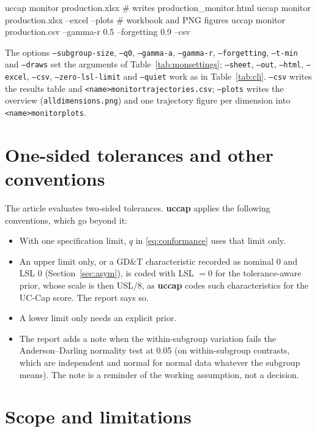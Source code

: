 \documentclass[a4paper,11pt,oneside,openany,parskip=half-,headings=standardclasses,toc=flat,numbers=noenddot]{scrbook}
\newcommand{\code}[1]{\texttt{\begingroup\def\_{\textunderscore\allowbreak}#1\endgroup}}
\newcommand{\pkg}{\textsf{\bfseries uccap}}
\newcommand{\secref}[1]{Section~\ref{#1}}
\newcommand{\tabref}[1]{Table~\ref{#1}}
\begin{document}
\begin{shcode}
uccap monitor production.xlsx                  # writes production_monitor.html
uccap monitor production.xlsx --excel --plots  # workbook and PNG figures
uccap monitor production.csv --gamma-r 0.5 --forgetting 0.9 --csv
\end{shcode}

The options \code{--subgroup-size}, \code{--q0}, \code{--gamma-a}, \code{--gamma-r}, \code{--forgetting},
\code{--t-min} and \code{--draws} set the arguments of \tabref{tab:monsettings}; \code{--sheet}, \code{--out},
\code{--html}, \code{--excel}, \code{--csv}, \code{--zero-lsl-limit} and \code{--quiet} work as in \tabref{tab:cli}.
\code{--csv} writes the results table and \code{<name>\_monitor\_trajectories.csv}; \code{--plots} writes the overview
(\code{all\_dimensions.png}) and one trajectory figure per dimension into \code{<name>\_monitor\_plots}.

\section{One-sided tolerances and other conventions}

The article evaluates two-sided tolerances. \pkg{} applies the following conventions, which go beyond it:
\begin{itemize}
\item With one specification limit, $q$ in \eqref{eq:conformance} uses that limit only.
\item An upper limit only, or a GD\&T characteristic recorded as nominal 0 and LSL 0 (\secref{sec:asym}), is coded
  with LSL $= 0$ for the tolerance-aware prior, whose scale is then USL$/8$, as \pkg{} codes such characteristics for
  the UC-Cap score. The report says so.
\item A lower limit only needs an explicit prior.
\item The report adds a note when the within-subgroup variation fails the Anderson--Darling normality test at 0.05
  (on within-subgroup contrasts, which are independent and normal for normal data whatever the subgroup means).
  The note is a reminder of the working assumption, not a decision.
\end{itemize}

\section{Scope and limitations}
\end{document}
